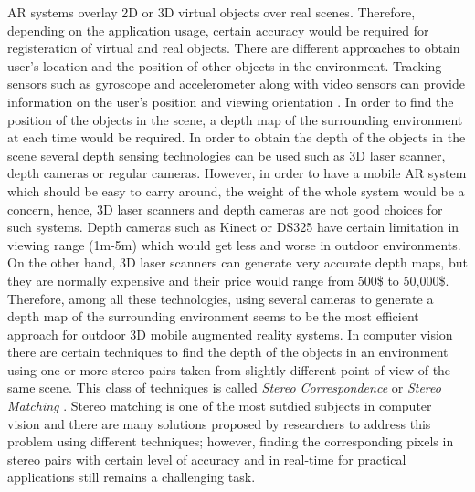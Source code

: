 \documentclass[dvips,letterpaper,12pt]{report}
\begin{document}
AR systems overlay 2D or 3D virtual objects over real scenes. Therefore, depending on the application usage, certain accuracy would be required for 
registeration of virtual and real objects. There are different approaches to obtain user's location and the position of other objects in the environment.
Tracking sensors such as gyroscope and accelerometer along with video sensors can provide information on the user's position and viewing orientation \cite{azum01}.
In order to find the position of the objects in the scene, a depth map of the surrounding environment at each time would be required. In order to obtain the depth of the 
objects in the scene several depth sensing technologies can be used such as 3D laser scanner, depth cameras or regular cameras. However, in order to have a mobile AR
system which should be easy to carry around, the weight of the whole system would be a concern, hence, 3D laser scanners and depth cameras are not good choices for such systems.
Depth cameras such as Kinect or DS325 have certain limitation in viewing range (1m-5m) which would get less and worse in outdoor environments. On the other hand, 3D laser scanners can
generate very accurate depth maps, but they are normally expensive and their price would range from 500\$ to 50,000\$. Therefore, among all these technologies, using several 
cameras to generate a depth map of the surrounding environment seems to be the most efficient approach for outdoor 3D mobile augmented reality systems. {\newline}
In computer vision there are certain techniques to find the depth of the objects in an environment using one or more stereo pairs taken from slightly different point of view of the same scene. 
This class of techniques is called {\it Stereo Correspondence} or {\it Stereo Matching} \cite{sze11}. Stereo matching is one of the most sutdied subjects in computer vision and there
are many solutions proposed by researchers to address this problem using different techniques; however, finding the corresponding pixels in stereo pairs with certain level of accuracy and in real-time
for practical applications still remains a challenging task. {\newline}
\end{document}

